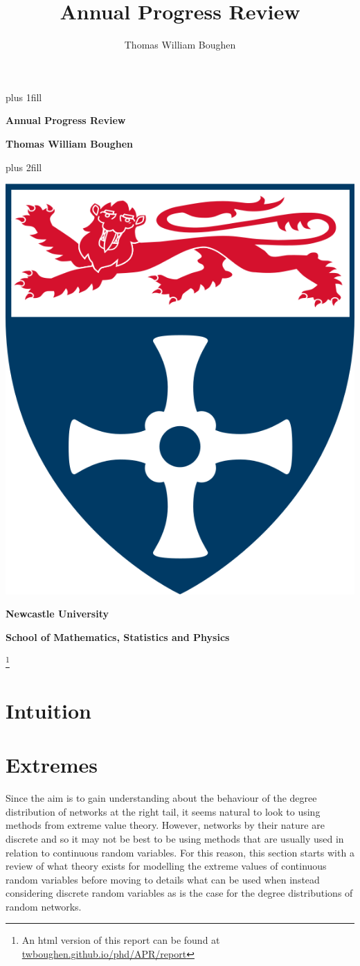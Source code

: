 \documentclass[
  10pt,
  a4paper,
]{scrreprt}
\title{Annual Progress Review}
\author{Thomas William Boughen}
\date{}
\theoremstyle{plain}
\theoremstyle{definition}
\theoremstyle{remark}
\begin{document}
\cleardoublepage
\thispagestyle{empty}
{\centering
\hbox{}\vskip 0cm plus 1fill
{\Huge\bfseries Annual Progress Review \par}
\vspace{12ex}
{\Large\bfseries Thomas William Boughen \par}
\vspace{3ex}
\vskip 0cm plus 2fill
\vspace{3ex}
{\bfseries\large  \par}
\vspace{12ex}
{\includegraphics[width=0.1\linewidth]{"imgs/University_of_Newcastle_Coat_of_Arms.png"}\par}
%
%
{\bfseries\large Newcastle University \par}
\vspace{3ex}
%
{\bfseries\large School of Mathematics, Statistics and Physics \par}
%
\vspace{12ex}
\footnote{An html version of this report can be found at \url{twboughen.github.io/phd/APR/report}}
\justifying
\noindent\ifdefined\Shaded\renewenvironment{Shaded}{\begin{tcolorbox}[enhanced, sharp corners, breakable, boxrule=0pt, frame hidden, interior hidden, borderline west={3pt}{0pt}{shadecolor}]}{\end{tcolorbox}}\fi

\hypertarget{sec-int}{%
\chapter{Intuition}\label{sec-int}}

\hypertarget{sec-ext}{%
\chapter{Extremes}\label{sec-ext}}

Since the aim is to gain understanding about the behaviour of the degree
distribution of networks at the right tail, it seems natural to look to
using methods from extreme value theory. However, networks by their
nature are discrete and so it may not be best to be using methods that
are usually used in relation to continuous random variables. For this
reason, this section starts with a review of what theory exists for
modelling the extreme values of continuous random variables before
moving to details what can be used when instead considering discrete
random variables as is the case for the degree distributions of random
networks.

}
\end{document}
